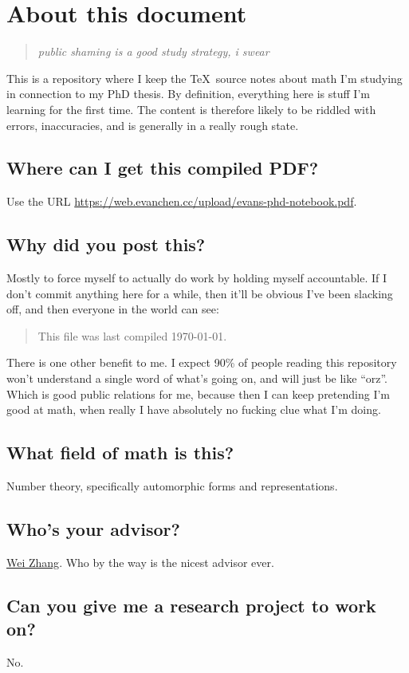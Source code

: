 \chapter*{About this document}
\begin{quote}
\itshape public shaming is a good study strategy, i swear
\end{quote}

This is a repository where I keep the \TeX\ source notes about math I'm studying
in connection to my PhD thesis. By definition, everything here is stuff I'm
learning for the first time. The content is therefore likely to be riddled with
errors, inaccuracies, and is generally in a really rough state.

\section*{Where can I get this compiled PDF?}
Use the URL \url{https://web.evanchen.cc/upload/evans-phd-notebook.pdf}.

\section*{Why did you post this?}
Mostly to force myself to actually do work by holding myself accountable. If I
don't commit anything here for a while, then it'll be obvious I've been slacking
off, and then everyone in the world can see:

\begin{quote}
  This file was last compiled \today.
\end{quote}

There is one other benefit to me. I expect 90\% of people reading this repository
won't understand a single word of what's going on, and will just be like ``orz''.
Which is good public relations for me, because then I can keep pretending I'm
good at math, when really I have absolutely no fucking clue what I'm doing.

\section*{What field of math is this?}
Number theory, specifically automorphic forms and representations.

\section*{Who's your advisor?}
\href{https://en.wikipedia.org/wiki/Wei_Zhang_(mathematician)}{Wei Zhang}.
Who by the way is the nicest advisor ever.

\section*{Can you give me a research project to work on?}
No.
